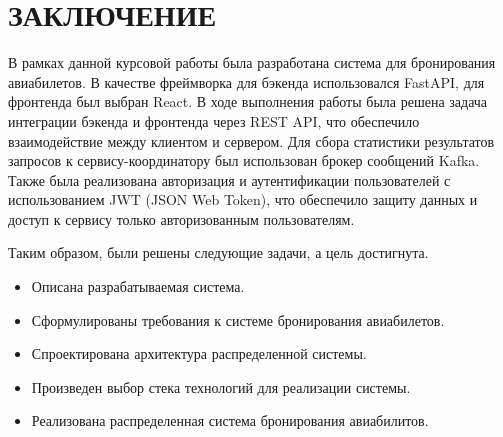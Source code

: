 \part*{ЗАКЛЮЧЕНИЕ}
В рамках данной курсовой работы была разработана система для бронирования авиабилетов. В качестве фреймворка для бэкенда использовался FastAPI, для фронтенда был выбран React. В ходе выполнения работы была решена задача интеграции бэкенда и фронтенда через REST API, что обеспечило взаимодействие между клиентом и сервером. Для сбора статистики результатов запросов к сервису-координатору был использован брокер сообщений Kafka. Также была реализована авторизация и аутентификации пользователей с использованием JWT (JSON Web Token), что обеспечило защиту данных и доступ к сервису только авторизованным пользователям.

Таким образом, были решены следующие задачи, а цель достигнута.
\begin{itemize}[label = ---]
  \item Описана разрабатываемая система.
  \item Сформулированы требования к системе бронирования авиабилетов.
  \item Спроектирована архитектура распределенной системы.
  \item Произведен выбор стека технологий для реализации системы.
  \item Реализована распределенная система бронирования авиабилитов.
\end{itemize}
